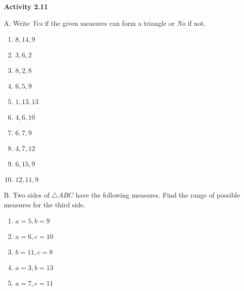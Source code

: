  \vspace{1ex}
\noindent\textbf{Activity 2.11}


A. Write \emph{Yes} if the given measures can form a triangle or \emph{No} if not.

\begin{multicols}{3}
\begin{enumerate}[noitemsep, label = \color{blue}\arabic*. ]%
   \item $ 8, 14, 9 $
   \item $ 3, 6, 2 $
   \item $ 8, 2, 8 $
   \item $ 6, 5, 9 $
   \item $ 1, 13, 13 $
   \item $ 4, 6, 10 $
   \item $ 6, 7, 9 $
   \item $ 4, 7, 12 $
   \item $ 6, 15, 9 $
   \item $ 12, 11, 9 $
\end{enumerate}
\end{multicols}
				
B. Two sides of $ \triangle ABC $ have the following measures.  Find the range of possible measures for the third side.

\begin{multicols}{2}
\begin{enumerate}[noitemsep, label = \color{blue}\arabic*. ]%
   \item $ a = 5, b = 9 $
   \item $ a = 6, c = 10 $
   \item $ b = 11, c = 8 $
   \item $ a = 3, b = 13 $
   \item $ a = 7, c = 11 $
\end{enumerate}
\end{multicols}
				
								
